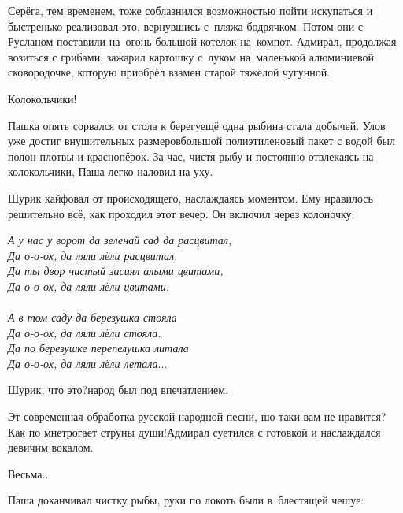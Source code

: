 Серёга, тем временем, тоже соблазнился возможностью пойти искупаться и быстренько реализовал это, вернувшись с~пляжа бодрячком. Потом они с Русланом поставили на~огонь большой котелок на~компот. Адмирал, продолжая возиться с грибами, зажарил картошку с~луком на~маленькой алюминиевой сковородочке, которую приобрёл взамен старой тяжёлой чугунной. 

\diagdash Колокольчики!

Пашка опять сорвался от стола к берегу\mdash ещё одна рыбина стала добычей. Улов уже достиг внушительных размеров\mdash большой полиэтиленовый пакет с водой был полон плотвы и краснопёрок. За час, чистя рыбу и постоянно отвлекаясь на колокольчики, Паша легко наловил на уху.

Шурик кайфовал от происходящего, наслаждаясь моментом. Ему нравилось решительно всё, как проходил этот вечер. Он включил через колоночку:

\vspace{0.2cm}
\noindent\textit{%
	\hspace*{1.5cm}А у нас у ворот да зеленай сад да расцвитал,\\
	\hspace*{1.5cm}Да о-о-ох, да ляли лёли расцвитал.\\
	\hspace*{1.5cm}Да ты двор чистый засиял алыми цвитами,\\
	\hspace*{1.5cm}Да о-о-ох, да ляли лёли цвитами.\\
	\\
	\hspace*{1.5cm}А в том саду да березушка стояла\\
	\hspace*{1.5cm}Да о-о-ох, да ляли лёли стояла.\\
	\hspace*{1.5cm}Да по березушке перепелушка литала\\
	\hspace*{1.5cm}Да о-о-ох, да ляли лёли летала$\ldots$
}
\vspace{0.2cm}

\diagdash Шурик, что это?\mdash народ был под впечатлением.

\diagdash Эт современная обработка русской народной песни, шо таки вам не нравится? Как по мне\mdash трогает струны души!\mdash Адмирал суетился с готовкой и наслаждался девичим вокалом.

\diagdash Весьма$\ldots$

Паша доканчивал чистку рыбы, руки по локоть были в~блестящей чешуе:

